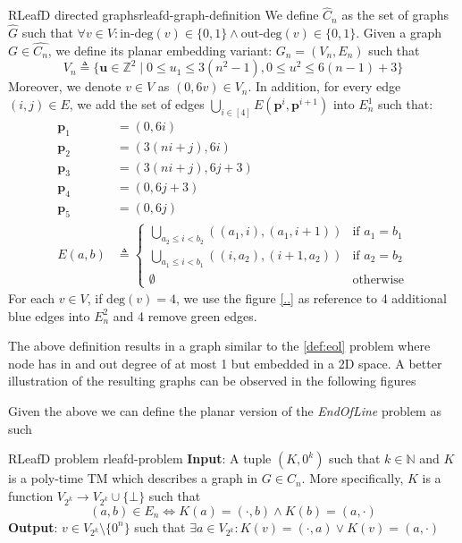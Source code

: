 \begin{definitionbox}{RLeafD directed graphs}{rleafd-graph-definition}
	\label{def:rleafd-graph-definition}
	We define $\hat{C}_n$  as the set of graphs $\hat{G}$ such that
	$\forall v \in V: \text{in-deg}(v) \in \{0,1\} \wedge \text{out-deg}(v) \in \{0,1\}$.
	Given a graph $G \in \hat{C_n}$,  we define its planar embedding variant: $G_n = (V_n, E_n)$ such that
	$$
	V_{n} \triangleq \Big\{  \mathbf{u} \in \mathbb{Z}^2 \mid 0 \leq u_{1} \leq 3(n^2 - 1), 0 \leq u^2 \leq 6(n - 1) + 3 \Big\}
	$$
	Moreover, we denote $v \in V$ as $(0, 6v) \in V_n$. In addition, for every edge $(i,j) \in E$, we add the set of edges
	$\bigcup_{i \in [4]} E(\mathbf{p}^i, \mathbf{p}^{i+1})$ into $E_n^1$ such that:
	\begin{align*}
		\mathbf{p}_1 &= (0, 6i) \\
		\mathbf{p}_2 &= (3(ni + j), 6i) \\
		\mathbf{p}_3 &= (3(ni + j), 6j + 3) \\
		\mathbf{p}_4 &= (0, 6j + 3) \\
		\mathbf{p}_5 &= (0, 6j) \\
		E(a,b)&\triangleq
		\begin{cases} 
			\bigcup_{a_2 \leq i < b_2} ((a_1, i), (a_1, i + 1)) & \text{if } a_1 = b_1\\
			\bigcup_{a_1 \leq i < b_1} ((i, a_2), (i + 1, a_2)) & \text{if } a_2 = b_2 \\
			\emptyset & \text{otherwise}
		\end{cases} 
	\end{align*}
	For each $v \in V$, if $\text{deg}(v) = 4$, we use the figure \ref{..} as reference to 4 additional blue edges 
	into $E^2_n$ and 4 remove green edges.
\end{definitionbox}

The above definition results in a graph similar to the \ref{def:eol} problem where node has in and out degree of at most 1
but embedded in a 2D space. A better illustration of the resulting graphs can be observed in the following figures

	
	
Given the above we can define the planar version of the \textit{EndOfLine} problem as such

\begin{definitionbox}{RLeafD problem \cite{chen_Complexity2DDiscrete_2009}}{rleafd-problem}
	\label{def:rleafd-problem}
	\textbf{Input}: A tuple $(K, 0^k)$ such that $k \in \mathbb{N}$ and $K$ is a poly-time TM
	which describes a graph in $G \in C_n$.
	More specifically, $K$ is a function $V_{2^k} \to V_{2^k} \cup \{\bot\}$ such that
	$$
	(a,b) \in E_n \iff K(a) = (\cdot, b) \wedge  K(b) = (a, \cdot)
	$$
	\textbf{Output}: $v \in V_{2^k} \setminus \{0^n\}$ such that
	$\exists a \in V_{2^k}: K(v) = (\cdot, a) \vee K(v) = (a, \cdot)$
\end{definitionbox}



